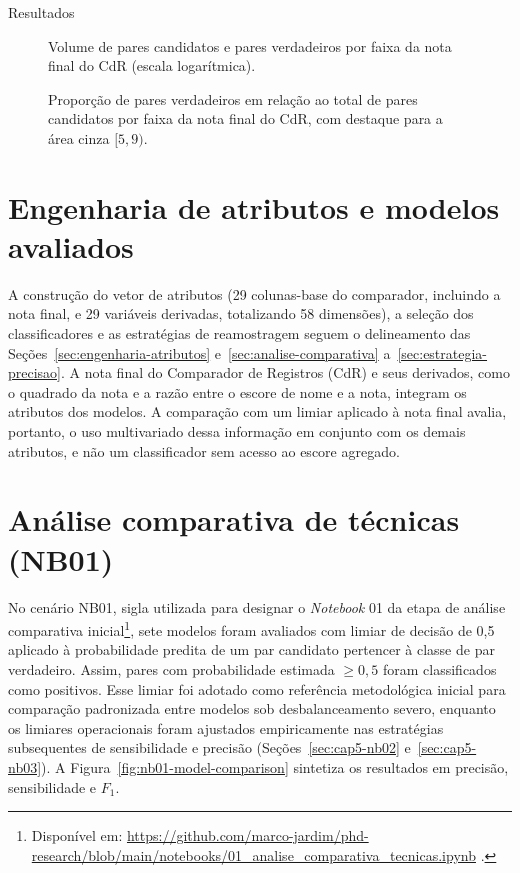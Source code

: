 \begin{chapter}{Resultados}


\begin{figure}[!ht]
\centering

\caption{Volume de pares candidatos e pares verdadeiros por faixa da nota final do CdR (escala logarítmica).}
\label{fig:score-band-volume}
\end{figure}

\begin{figure}[!ht]
\centering

\caption{Proporção de pares verdadeiros em relação ao total de pares candidatos por faixa da nota final do CdR, com destaque para a área cinza $[5,9)$.}
\label{fig:score-band-pct}
\end{figure}

\section{Engenharia de atributos e modelos avaliados}

A construção do vetor de atributos (29 colunas-base do comparador, incluindo a nota final, e 29 variáveis derivadas, totalizando 58 dimensões), a seleção dos classificadores e as estratégias de reamostragem seguem o delineamento das Seções~\ref{sec:engenharia-atributos} e~\ref{sec:analise-comparativa} a~\ref{sec:estrategia-precisao}. A nota final do Comparador de Registros (CdR) e seus derivados, como o quadrado da nota e a razão entre o escore de nome e a nota, integram os atributos dos modelos. A comparação com um limiar aplicado à nota final avalia, portanto, o uso multivariado dessa informação em conjunto com os demais atributos, e não um classificador sem acesso ao escore agregado.

\section{Análise comparativa de técnicas (NB01)}
\label{sec:cap5-nb01}

No cenário NB01, sigla utilizada para designar o \textit{Notebook} 01 da etapa de análise comparativa inicial\footnote{Disponível em: \url{https://github.com/marco-jardim/phd-research/blob/main/notebooks/01_analise_comparativa_tecnicas.ipynb} \cite{Jardim2026phdrepo}.}, sete modelos foram avaliados com limiar de decisão de 0,5 aplicado à probabilidade predita de um par candidato pertencer à classe de par verdadeiro. Assim, pares com probabilidade estimada $\geq 0{,}5$ foram classificados como positivos. Esse limiar foi adotado como referência metodológica inicial para comparação padronizada entre modelos sob desbalanceamento severo, enquanto os limiares operacionais foram ajustados empiricamente nas estratégias subsequentes de sensibilidade e precisão (Seções~\ref{sec:cap5-nb02} e~\ref{sec:cap5-nb03}). A Figura~\ref{fig:nb01-model-comparison} sintetiza os resultados em precisão, sensibilidade e $F_1$.


\end{chapter}
